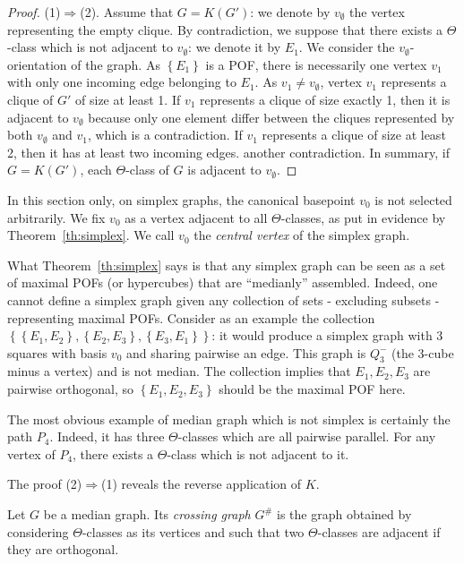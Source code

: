 \documentclass[a4paper,UKenglish,numberwithinsect,cleveref, autoref]{lipics-v2021}
\newcommand{\set}[1]{\left\{ #1 \right\}}
\begin{document}
\begin{proof}
(1)$\Rightarrow$(2). Assume that $G=K(G')$: we denote by $v_{\emptyset}$ the vertex representing the empty clique. By contradiction, we suppose that there exists a $\Theta$-class which is not adjacent to $v_{\emptyset}$: we denote it by $E_1$. We consider the $v_{\emptyset}$-orientation of the graph. As $\set{E_1}$ is a POF, there is necessarily one vertex $v_1$ with only one incoming edge belonging to $E_1$. As $v_1 \neq v_{\emptyset}$, vertex $v_1$ represents a clique of $G'$ of size at least 1. If $v_1$ represents a clique of size exactly 1, then it is adjacent to $v_{\emptyset}$ because only one element differ between the cliques represented by both $v_{\emptyset}$ and $v_1$, which is a contradiction. If $v_1$ represents a clique of size at least 2, then it has at least two incoming edges. another contradiction. In summary, if $G=K(G')$, each $\Theta$-class of $G$ is adjacent to $v_{\emptyset}$.
\end{proof}

In this section only, on simplex graphs, the canonical basepoint $v_0$ is not selected arbitrarily. We fix $v_0$ as a vertex adjacent to all $\Theta$-classes, as put in evidence by Theorem~\ref{th:simplex}. We call $v_0$ the \textit{central vertex} of the simplex graph.

What Theorem~\ref{th:simplex} says is that any simplex graph can be seen as a set of maximal POFs (or hypercubes) that are ``medianly'' assembled. Indeed, one cannot define a simplex graph given any collection of sets - excluding subsets - representing maximal POFs. Consider as an example the collection $\set{\set{E_1,E_2},\set{E_2,E_3},\set{E_3,E_1}}$: it would produce a simplex graph with 3 squares with basis $v_0$ and sharing pairwise an edge. This graph is $Q_3^-$ (the 3-cube minus a vertex) and is not median. The collection implies that $E_1,E_2,E_3$ are pairwise orthogonal, so $\set{E_1,E_2,E_3}$ should be the maximal POF here.

The most obvious example of median graph which is not simplex is certainly the path $P_4$. Indeed, it has three $\Theta$-classes which are all pairwise parallel. For any vertex of $P_4$, there exists a $\Theta$-class which is not adjacent to it.

The proof (2)$\Rightarrow$(1) reveals the reverse application of $K$. 

\begin{definition}
Let $G$ be a median graph. Its \textit{crossing graph} $G^{\#}$ is the graph obtained by considering $\Theta$-classes as its vertices and such that two $\Theta$-classes are adjacent if they are orthogonal.
\label{def:crossing}
\end{definition}
\end{document}
